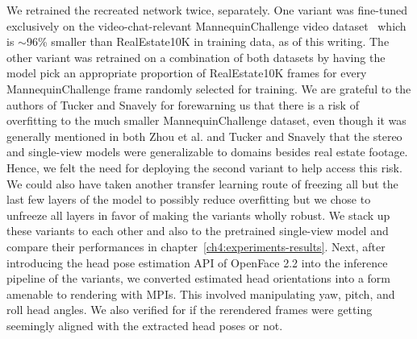 We retrained the recreated network twice, separately. One variant was fine-tuned exclusively on the video-chat-relevant MannequinChallenge video dataset~\cite{li2019learning} which is $\sim$96\% smaller than RealEstate10K in training data, as of this writing. The other variant was retrained on a combination of both datasets by having the model pick an appropriate proportion of RealEstate10K frames for every MannequinChallenge frame randomly selected for training. We are grateful to the authors of Tucker and Snavely for forewarning us that there is a risk of overfitting to the much smaller MannequinChallenge dataset, even though it was generally mentioned in both Zhou et al. and Tucker and Snavely that the stereo and single-view models were generalizable to domains besides real estate footage. Hence, we felt the need for deploying the second variant to help access this risk. We could also have taken another transfer learning route of freezing all but the last few layers of the model to possibly reduce overfitting but we chose to unfreeze all layers in favor of making the variants wholly robust. We stack up these variants to each other and also to the pretrained single-view model and compare their performances in chapter~\ref{ch4:experiments-results}. Next, after introducing the head pose estimation API of OpenFace 2.2 into the inference pipeline of the variants, we converted estimated head orientations into a form amenable to rendering with MPIs. This involved manipulating yaw, pitch, and roll head angles. We also verified for if the rerendered frames were getting seemingly aligned with the extracted head poses or not.




